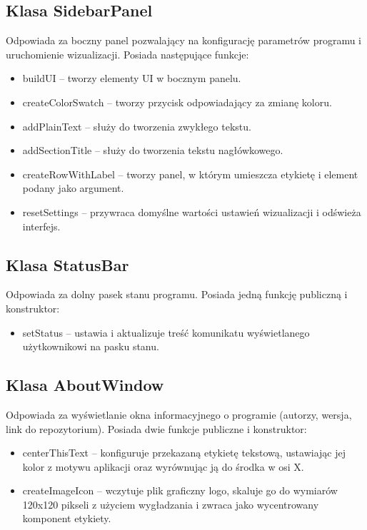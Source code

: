 \documentclass[]{article}
\begin{document}
    \subsection{Klasa SidebarPanel}
    Odpowiada za boczny panel pozwalający na konfigurację parametrów programu i uruchomienie wizualizacji. Posiada następujące funkcje:
    \begin{itemize}
        \item buildUI -- tworzy elementy UI w bocznym panelu.
        \item createColorSwatch -- tworzy przycisk odpowiadający za zmianę koloru.
        \item addPlainText -- służy do tworzenia zwykłego tekstu.
        \item addSectionTitle -- służy do tworzenia tekstu nagłówkowego.
        \item createRowWithLabel -- tworzy panel, w którym umieszcza etykietę i element podany jako argument.
        \item resetSettings -- przywraca domyślne wartości ustawień wizualizacji i odświeża interfejs.
    \end{itemize}
    \subsection{Klasa StatusBar}
   Odpowiada za dolny pasek stanu programu. Posiada jedną funkcję publiczną i konstruktor:
    \begin{itemize}
        \item setStatus -- ustawia i aktualizuje treść komunikatu wyświetlanego użytkownikowi na pasku stanu.
    \end{itemize}

    \subsection{Klasa AboutWindow}

    Odpowiada za wyświetlanie okna informacyjnego o programie (autorzy, wersja, link do repozytorium). Posiada dwie funkcje publiczne i konstruktor:

    \begin{itemize}
        \item centerThisText -- konfiguruje przekazaną etykietę tekstową, ustawiając jej kolor z motywu aplikacji oraz wyrównując ją do środka w osi X.
        \item createImageIcon -- wczytuje plik graficzny logo, skaluje go do wymiarów 120x120 pikseli z użyciem wygładzania i zwraca jako wycentrowany komponent etykiety.
    \end{itemize}
\end{document}
